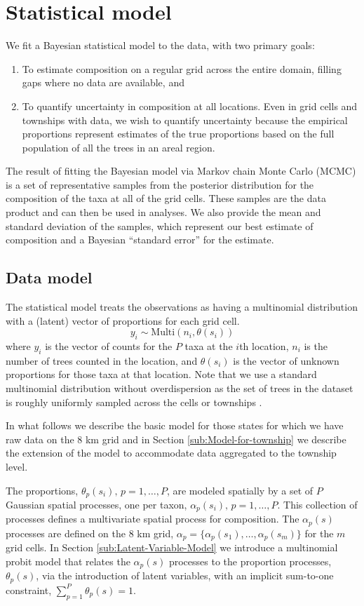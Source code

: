 \documentclass[12pt]{article}\usepackage[]{graphicx}\usepackage[]{color}
\begin{document}
\section{Statistical model}

We fit a Bayesian statistical model to the data, with two primary
goals:
\begin{enumerate}
\item To estimate composition on a regular grid across the entire domain,
filling gaps where no data are available, and
\item To quantify uncertainty in composition at all locations. Even in grid
cells and townships with data, we wish to quantify uncertainty because
the empirical proportions represent estimates of the true proportions
based on the full population of all the trees in an areal region.
\end{enumerate}
The result of fitting the Bayesian model via Markov chain Monte Carlo
(MCMC) is a set of representative samples from the posterior distribution
for the composition of the taxa at all of the grid cells. These samples
are the data product and can then be used in analyses. We also provide
the mean and standard deviation of the samples, which represent our
best estimate of composition and a Bayesian ``standard error'' for
the estimate. 


\subsection{Data model}

The statistical model treats the observations as having a multinomial
distribution with a (latent) vector of proportions for each grid cell.
\[
y_{i}\sim\mbox{Multi}(n_{i},\theta(s_{i}))
\]
where $y_{i}$ is the vector of counts for the $P$ taxa at the $i$th
location, $n_{i}$ is the number of trees counted in the location,
and $\theta(s_{i})$ is the vector of unknown proportions for those
taxa at that location. Note that we use a standard multinomial distribution
without overdispersion as the set of trees in the dataset is roughly
uniformly sampled across the cells or townships \citep{Gori:etal:2015}.

In what follows we describe the basic model for those states for which
we have raw data on the 8 km grid and in Section \ref{sub:Model-for-township}
we describe the extension of the model to accommodate data aggregated
to the township level.

The proportions, $\theta_{p}(s_{i}),\, p=1,\ldots,P$, are modeled
spatially by a set of $P$ Gaussian spatial processes, one per taxon,
$\alpha_{p}(s_{i}),\, p=1,\ldots,P$. This collection of processes
defines a multivariate spatial process for composition. The $\alpha_{p}(s)$
processes are defined on the 8 km grid, $\alpha_{p}=\{\alpha_{p}(s_{1}),\ldots,\alpha_{p}(s_{m})\}$
for the $m$ grid cells. In Section \ref{sub:Latent-Variable-Model}
we introduce a multinomial probit model that relates the $\alpha_{p}(s)$
processes to the proportion processes, $\theta_{p}(s)$, via the introduction
of latent variables, with an implicit sum-to-one constraint, $\sum_{p=1}^{P}\theta_{p}(s)=1$.
\end{document}
